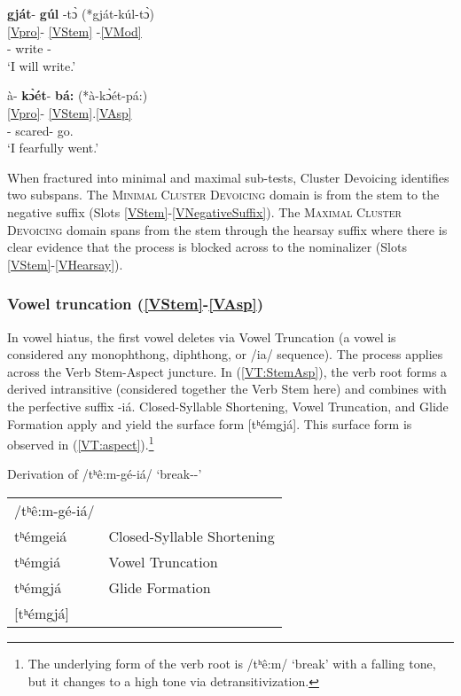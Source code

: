 \documentclass[output=paper]{langscibook}
\begin{document}
\ea \label{cluster:pro}
\glll \textbf{gját}- \textbf{gúl} -t\`{ɔ} (*gját-kúl-t\`{ɔ})\\
{\ref{Vpro}}- \ref{VStem} -\ref{VMod} \\
[\First\Sg/\Aarg:\Pl/\Obj]- write -{\Fut} \\
\trans `I will write.' \citep[][85]{Miller:2018}
\z

\ea \label{cluster:incorp}
\glll \`a- \textbf{k\`{ɔ}ét}- \textbf{bá:} (*\`a-k\`{ɔ}ét-pá:) \\
{\ref{Vpro}}- \ref{VStem}.\ref{VAsp} \\
[\First\Sg]- scared- go.{\Pfv} \\
\trans `I fearfully went.' \citep[][85]{Miller:2018}
\z

When fractured into minimal and maximal sub-tests, Cluster Devoicing identifies two subspans. The \textsc{Minimal Cluster Devoicing} domain is from the stem to the negative suffix (Slots \ref{VStem}-\ref{VNegativeSuffix}). The \textsc{Maximal Cluster Devoicing} domain spans from the stem through the hearsay suffix where there is clear evidence that the process is blocked across to the nominalizer (Slots \ref{VStem}-\ref{VHearsay}).

\subsubsection{Vowel truncation (\ref{VStem}-\ref{VAsp})} \label{sec:VT}

In vowel hiatus, the first vowel deletes via Vowel Truncation (a vowel is considered any monophthong, diphthong, or /ia/ sequence). The process applies across the Verb Stem-Aspect juncture. In (\ref{VT:StemAsp}), the verb root forms a derived intransitive (considered together the Verb Stem here) and combines with the perfective suffix -iá. Closed-Syllable Shortening, Vowel Truncation, and Glide Formation apply and yield the surface form [tʰémgjá]. This surface form is observed in (\ref{VT:aspect}).\footnote{The underlying form of the verb root is /tʰê:m/ `break' with a falling tone, but it changes to a high tone via detransitivization.}


\ea Derivation of /tʰê:m-gé-iá/ {`break-{\Itrd}-{\Pfv}'} \label{VT:StemAsp} \\
\begin{tabular}{ll}
    {/tʰê:m-gé-iá/} &  \\
    tʰémgeiá & Closed-Syllable Shortening \\
    tʰémgiá& Vowel Truncation \\
    tʰémgjá & Glide Formation \\
    {[tʰémgjá]} & \\
\end{tabular} 
\z 
\end{document}
